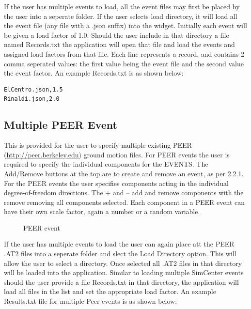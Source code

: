If the user has multiple events to load, all the event files may first be placed by the user into a seperate folder. If the
user selects load directory, it will load all the event file (any file with a .json suffix) into the widget. Initially each event
will be given a load factor of 1.0. Should the user include in that directory a file named Records.txt the application will open 
that file and load the events and assigned load factors from that file. Each line represents a record, and contains 2 comma seperated values: the first value being the event file and the second value the event factor. An example Records.txt is as shown below:

\begin{verbatim}
ElCentro.json,1.5
Rinaldi.json,2.0
\end{verbatim}


\subsection{Multiple PEER Event}
This is provided for the user to specify multiple existing PEER 
(\href{http://peer.berkeley.edu}{http://peer.berkeley.edu}) ground motion files. 
For PEER events the user is required to specify the individual components for the EVENTS. 
The Add/Remove buttons at the top are to create and remove an event, as per 2.2.1. 
For the PEER events the user specifies components acting in the individual degree-of-freedom directions. 
The + and – add and remove components with the remove removing all components selected. 
Each component in a PEER event can have their own scale factor, again a number or a random variable.

\begin{figure}[!htbp]
  \caption{PEER event}
  \label{fig:figure6}
\end{figure}

If the user has multiple events to load the user can again place att the PEER .AT2 files into a seperate folder and slect the Load Directory option. This will allow the user to select a directory. Once selected all .AT2 files in that directory will be loaded into the application. Similar to loading multiple SimCenter events should the user provide a file Records.txt in that directory, the application will load all files in the list and set the appropriate load factor. An example Results.txt file for multiple Peer events is as shown below:

